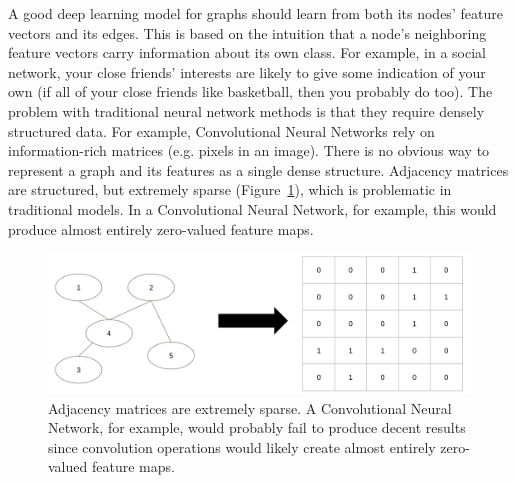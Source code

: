 A good deep learning model for graphs should learn from both its nodes' feature vectors and its edges. This is based on the intuition that a node's neighboring feature vectors carry information about its own class. For example, in a social network, your close friends' interests are likely to give some indication of your own (if all of your close friends like basketball, then you probably do too). The problem with traditional neural network methods is that they require densely structured data. For example, Convolutional Neural Networks rely on information-rich matrices (e.g. pixels in an image). There is no obvious way to represent a graph and its features as a single dense structure. Adjacency matrices are structured, but extremely sparse (Figure~\ref{fig:sparse}), which is problematic in traditional models. In a Convolutional Neural Network, for example, this would produce almost entirely zero-valued feature maps. 

\begin{figure}[h!]
	\centering
	\includegraphics[width=1\linewidth]{media/sparse.png} 
	\caption{Adjacency matrices are extremely sparse. A Convolutional Neural Network, for example, would probably fail to produce decent results since convolution operations would likely create almost entirely zero-valued feature maps.}
	\label{fig:sparse}
\end{figure}

